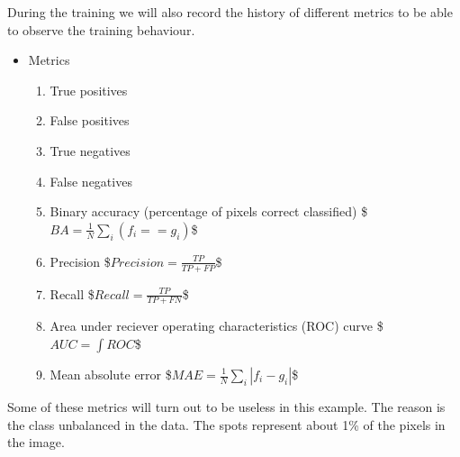 \documentclass[letterpaper,10pt,english]{sphinxmanual}
\begin{document}
During the training we will also record the history of different metrics to be able to observe the training behaviour.
\begin{itemize}
\item {} 
Metrics
\begin{enumerate}
%
\item {} 
True positives

\item {} 
False positives

\item {} 
True negatives

\item {} 
False negatives

\item {} 
Binary accuracy (percentage of pixels correct classified)
\$\(BA=\frac{1}{N}\sum_i(f_i==g_i)\)\$

\item {} 
Precision
\$\(Precision=\frac{TP}{TP+FP}\)\$

\item {} 
Recall
\$\(Recall=\frac{TP}{TP+FN}\)\$

\item {} 
Area under reciever operating characteristics (ROC) curve
\$\(AUC=\int ROC\)\$

\item {} 
Mean absolute error
\$\(MAE=\frac{1}{N}\sum_i|f_i-g_i|\)\$

\end{enumerate}

\end{itemize}

Some of these metrics will turn out to be useless in this example. The reason is the class unbalanced in the data. The spots represent about 1\% of the pixels in the image.
\end{document}
